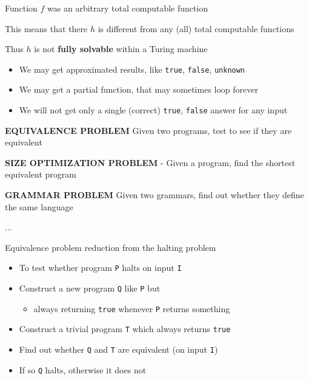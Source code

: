 \documentclass{beamer}
\begin{document}
\begin{slide}{
\item Function $f$ was an arbitrary total computable function
\item This means that there $h$ is different from any (all) total computable functions
\item Thus $h$ is not \textbf{fully solvable} within a Turing machine
\begin{itemize}
\item We may get approximated results, like \texttt{true}, \texttt{false}, \texttt{unknown}
\item We may get a partial function, that may sometimes loop forever
\item We will not get only a single (correct) \texttt{true}, \texttt{false} answer for any input
\end{itemize}
}\end{slide}

\begin{slide}{
\item \textbf{EQUIVALENCE PROBLEM} Given two programs, test to see if they are equivalent
\item \textbf{SIZE OPTIMIZATION PROBLEM} - Given a program, find the shortest equivalent program
\item \textbf{GRAMMAR PROBLEM} Given two grammars, find out whether they define the same language
\item ...
}\end{slide}

\begin{slide}{
\item Equivalence problem reduction from the halting problem
\begin{itemize}
\item To test whether program \texttt{P} halts on input \texttt{I}
\item Construct a new program \texttt{Q} like \texttt{P} but
\begin{itemize}
\item always returning \texttt{true} whenever \texttt{P} returns something
\end{itemize}
\item Construct a trivial program \texttt{T} which always returns \texttt{true}
\item Find out whether \texttt{Q} and \texttt{T} are equivalent (on input \texttt{I})
\item If so \texttt{Q} halts, otherwise it does not
\end{itemize}
}\end{slide}
\end{document}
